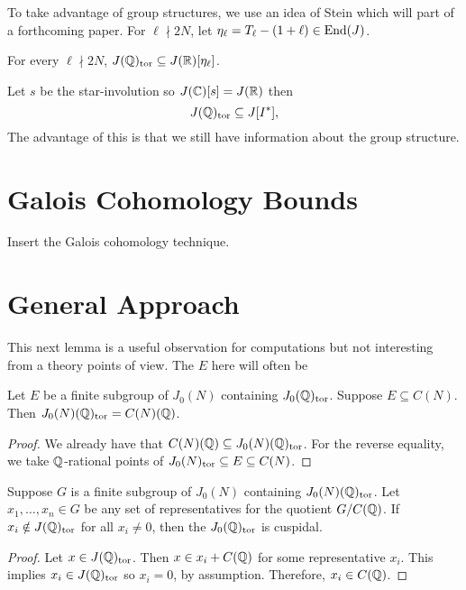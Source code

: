 \documentclass[11pt, proquest]{uwthesis}
\begin{document}
To take advantage of group structures, we use an idea of Stein which will part
of a forthcoming paper. For $\ell\nmid 2N$, let $\eta_\ell = T_\ell -
(1+\ell)\in \operatorname{End}(J)$.

\begin{lemma}[Stein]
    For every $\ell\nmid 2N$, $J(\mathbb{Q})_{\mathrm{tor}}\subseteq J(\mathbb{R})[\eta_\ell]$.
\end{lemma}

Let $s$ be the star-involution so $J(\mathbb{C})[s]=J(\mathbb{R})$ then
\[
    J(\mathbb{Q})_{\mathrm{tor}} \subseteq J[I^*],
\]
The advantage of this is that we still have information about the group
structure.

\section{Galois Cohomology Bounds}%
\label{sec:galois_cohomology_bounds}

Insert the Galois cohomology technique.

\section{General Approach}

This next lemma is a useful observation for computations but not interesting
from a theory points of view. The $E$ here will often be
\begin{lemma}
    Let $E$ be a finite subgroup of $J_0(N)$ containing $J_0(\mathbb{Q})_{\mathrm{tor}}$.
    Suppose $E\subseteq C(N)$. Then $J_0(N)(\mathbb{Q})_{\mathrm{tor}}=C(N)(\mathbb{Q})$.
\end{lemma}
\begin{proof}
    We already have that $C(N)(\mathbb{Q})\subseteq J_0(N)(\mathbb{Q})_{\mathrm{tor}}$. For the
    reverse equality, we take $\mathbb{Q}$-rational points of $J_0(N)_{\mathrm{tor}}\subseteq E
    \subseteq C(N)$.
\end{proof}

\begin{proposition}
    Suppose $G$ is a finite subgroup of $J_0(N)$ containing $J_0(N)(\mathbb{Q})_{\mathrm{tor}}$.
    Let $x_1, \ldots, x_n\in G$ be any set of representatives for the quotient
    $G/C(\mathbb{Q})$. If $x_i\notin J(\mathbb{Q})_{\mathrm{tor}}$ for all $x_i\neq 0$, then the
    $J_0(\mathbb{Q})_{\mathrm{tor}}$ is cuspidal.
\end{proposition}
\begin{proof}
    Let $x\in J(\mathbb{Q})_{\mathrm{tor}}$. Then $x\in x_i+C(\mathbb{Q})$ for some representative
    $x_i$. This implies $x_i\in J(\mathbb{Q})_{\mathrm{tor}}$ so $x_i=0$, by assumption.
    Therefore, $x_i\in C(\mathbb{Q})$.
\end{proof}
\end{document}
